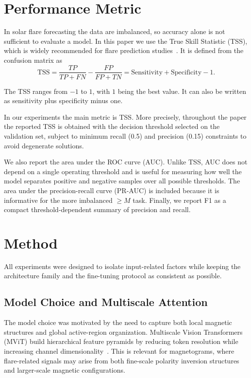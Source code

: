 \documentclass[runningheads]{llncs}
\begin{document}
\section{Performance Metric}

In solar flare forecasting the data are imbalanced, so accuracy alone is not sufficient to evaluate a model. In this paper we use the True Skill Statistic (TSS), which is widely recommended for flare prediction studies~\cite{ref_bloomfield}. It is defined from the confusion matrix as
\begin{equation}
\mathrm{TSS} = \frac{TP}{TP + FN} - \frac{FP}{FP + TN} = \text{Sensitivity} + \text{Specificity} -1 .
\end{equation}

The TSS ranges from $-1$ to $1$, with $1$ being the best value. It can also be written as sensitivity plus specificity minus one.

In our experiments the main metric is TSS. More precisely, throughout the paper the reported TSS is obtained with the decision threshold selected on the validation set, subject to minimum recall (0.5) and precision (0.15) constraints to avoid degenerate solutions. 

We also report the area under the ROC curve (AUC). Unlike TSS, AUC does not depend on a single operating threshold and is useful for measuring how well the model separates positive and negative samples over all possible thresholds. The area under the precision-recall curve (PR-AUC) is included because it is informative for the more imbalanced $\geq M$ task. Finally, we report F1 as a compact threshold-dependent summary of precision and recall.

\section{Method}

All experiments were designed to isolate input-related factors while keeping the architecture family and the fine-tuning protocol as consistent as possible.

\subsection{Model Choice and Multiscale Attention}

The model choice was motivated by the need to capture both local magnetic structures and global active-region organization. Multiscale Vision Transformers (MViT) build hierarchical feature pyramids by reducing token resolution while increasing channel dimensionality~\cite{ref_mvit}. This is relevant for magnetograms, where flare-related signals may arise from both fine-scale polarity inversion structures and larger-scale magnetic configurations.
\end{document}
